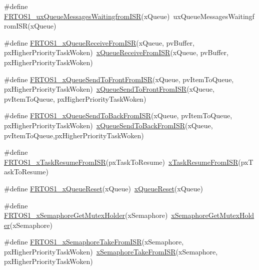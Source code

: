 \begin{DoxyCompactItemize}
\item 
\#define \hyperlink{group___f_r_t_o_s1__module_ga4a6dd9ea24d057b81d2278d783b33358}{F\+R\+T\+O\+S1\+\_\+ux\+Queue\+Messages\+Waitingfrom\+I\+SR}(x\+Queue)~ux\+Queue\+Messages\+Waitingfrom\+I\+SR(x\+Queue)
\item 
\#define \hyperlink{group___f_r_t_o_s1__module_ga704b51f1302338d677287f77fc9f2a99}{F\+R\+T\+O\+S1\+\_\+x\+Queue\+Receive\+From\+I\+SR}(x\+Queue,  pv\+Buffer,  px\+Higher\+Priority\+Task\+Woken)~\hyperlink{queue_8h_acdf528f5c91131ae2f31c669cfd65758}{x\+Queue\+Receive\+From\+I\+SR}(x\+Queue, pv\+Buffer, px\+Higher\+Priority\+Task\+Woken)
\item 
\#define \hyperlink{group___f_r_t_o_s1__module_ga8197f076cd857ec5476ab2d359edc72a}{F\+R\+T\+O\+S1\+\_\+x\+Queue\+Send\+To\+Front\+From\+I\+SR}(x\+Queue,  pv\+Item\+To\+Queue,  px\+Higher\+Priority\+Task\+Woken)~\hyperlink{queue_8h_af03b83396462affe9e28302660e7b9c6}{x\+Queue\+Send\+To\+Front\+From\+I\+SR}(x\+Queue, pv\+Item\+To\+Queue, px\+Higher\+Priority\+Task\+Woken)
\item 
\#define \hyperlink{group___f_r_t_o_s1__module_gabd9e044ab8e80092cdb4be700154733a}{F\+R\+T\+O\+S1\+\_\+x\+Queue\+Send\+To\+Back\+From\+I\+SR}(x\+Queue,  pv\+Item\+To\+Queue,  px\+Higher\+Priority\+Task\+Woken)~\hyperlink{queue_8h_a51e9f73417b11441a181cdc4f33a68e9}{x\+Queue\+Send\+To\+Back\+From\+I\+SR}(x\+Queue, pv\+Item\+To\+Queue,px\+Higher\+Priority\+Task\+Woken)
\item 
\#define \hyperlink{group___f_r_t_o_s1__module_ga93f84683e0388ccd7a44fc1e9117116e}{F\+R\+T\+O\+S1\+\_\+x\+Task\+Resume\+From\+I\+SR}(px\+Task\+To\+Resume)~\hyperlink{tasks_8c_a17fb13e7325d9dee9dec76f4a736138b}{x\+Task\+Resume\+From\+I\+SR}(px\+Task\+To\+Resume)
\item 
\#define \hyperlink{group___f_r_t_o_s1__module_ga2cfa9d51a66095c9a35136aca0a5d686}{F\+R\+T\+O\+S1\+\_\+x\+Queue\+Reset}(x\+Queue)~\hyperlink{queue_8h_a94df8d8bc938424151f8196db2f1177b}{x\+Queue\+Reset}(x\+Queue)
\item 
\#define \hyperlink{group___f_r_t_o_s1__module_ga93d06bc11bdc64cf1be4a5624db9cde5}{F\+R\+T\+O\+S1\+\_\+x\+Semaphore\+Get\+Mutex\+Holder}(x\+Semaphore)~\hyperlink{semphr_8h_a7403bfbc06fb8449b2334f55d939a4c4}{x\+Semaphore\+Get\+Mutex\+Holder}(x\+Semaphore)
\item 
\#define \hyperlink{group___f_r_t_o_s1__module_gacd326292cbd616697e16439191b295af}{F\+R\+T\+O\+S1\+\_\+x\+Semaphore\+Take\+From\+I\+SR}(x\+Semaphore,  px\+Higher\+Priority\+Task\+Woken)~\hyperlink{semphr_8h_a076419b58e072655686939016e7ca3c5}{x\+Semaphore\+Take\+From\+I\+SR}(x\+Semaphore, px\+Higher\+Priority\+Task\+Woken)

\end{DoxyCompactItemize}
